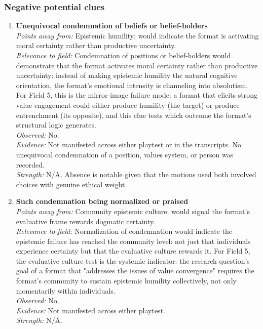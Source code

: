\subsubsection*{Negative potential clues}

\begin{enumerate}

\item \textbf{Unequivocal condemnation of beliefs or belief-holders}\\
\textit{Points away from:} Epistemic humility; would indicate the format is activating moral certainty rather than productive uncertainty.\\
\textit{Relevance to field:} Condemnation of positions or belief-holders would demonstrate that the format activates moral certainty rather than productive uncertainty: instead of making epistemic humility the natural cognitive orientation, the format's emotional intensity is channeling into absolutism. For Field 5, this is the mirror-image failure mode: a format that elicits strong value engagement could either produce humility (the target) or produce entrenchment (its opposite), and this clue tests which outcome the format's structural logic generates.\\
\textit{Observed:} No.\\
\textit{Evidence:} Not manifested across either playtest or in the transcripts. No unequivocal condemnation of a position, values system, or person was recorded.\\
\textit{Strength:} N/A. Absence is notable given that the motions used both involved choices with genuine ethical weight.

\item \textbf{Such condemnation being normalized or praised}\\
\textit{Points away from:} Community epistemic culture; would signal the format's evaluative frame rewards dogmatic certainty.\\
\textit{Relevance to field:} Normalization of condemnation would indicate the epistemic failure has reached the community level: not just that individuals experience certainty but that the evaluative culture rewards it. For Field 5, the evaluative culture test is the systemic indicator: the research question's goal of a format that "addresses the issues of value convergence" requires the format's community to sustain epistemic humility collectively, not only momentarily within individuals.\\
\textit{Observed:} No.\\
\textit{Evidence:} Not manifested across either playtest.\\
\textit{Strength:} N/A.

\end{enumerate}
